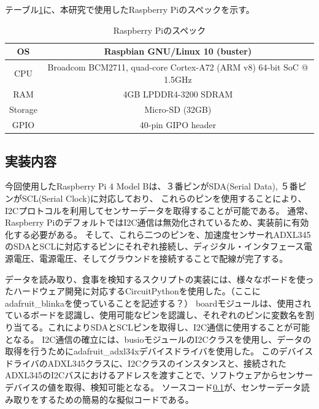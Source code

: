 テーブル\ref{tb:raspberry_pi_spec}に、本研究で使用したRaspberry Piのスペックを示す。

\begin{table}[htbp]
  \caption{Raspberry Piのスペック}
  \label{tb:raspberry_pi_spec}
  \begin{center}
    \begin{tabular}{|c||c|}
      \hline
      OS  & Raspbian GNU/Linux 10 (buster) \\\hline
      CPU & Broadcom BCM2711, quad-core Cortex-A72 (ARM v8) 64-bit SoC @ 1.5GHz \\\hline
      RAM & 4GB LPDDR4-3200 SDRAM \\\hline
      Storage & Micro-SD (32GB) \\\hline
      GPIO & 40-pin GIPO header \\\hline
    \end{tabular}
  \end{center}
\end{table}

\subsection{実装内容}

今回使用したRaspberry Pi 4 Model Bは、３番ピンがSDA(Serial Data), ５番ピンがSCL(Serial Clock)に対応しており、
これらのピンを使用することにより、I2Cプロトコルを利用してセンサーデータを取得することが可能である。
通常、Raspberry PiのデフォルトではI2C通信は無効化されているため、実装前に有効化する必要がある。
そして、これら二つのピンを、加速度センサーれADXL345のSDAとSCLに対応するピンにそれぞれ接続し、ディジタル・インタフェース電源電圧、電源電圧、そしてグラウンドを接続することで配線が完了する。\cite{adxl345_datasheet}

データを読み取り、食事を検知するスクリプトの実装には、様々なボードを使ったハードウェア開発に対応するCircuitPythonを使用した。（ここにadafruit\_blinkaを使っていることを記述する？）
boardモジュールは、使用されているボードを認識し、使用可能なピンを認識し、それぞれのピンに変数名を割り当てる。これによりSDAとSCLピンを取得し、I2C通信に使用することが可能となる。
I2C通信の確立には、busioモジュールのI2Cクラスを使用し、データの取得を行うためにadafruit\_adxl34xデバイスドライバを使用した。
このデバイスドライバのADXL345クラスに、I2Cクラスのインスタンスと、接続されたADXL345のI2Cバスにおけるアドレスを渡すことで、ソフトウェアからセンサーデバイスの値を取得、検知可能となる。
ソースコード\ref{}が、センサーデータ読み取りをするための簡易的な擬似コードである。

